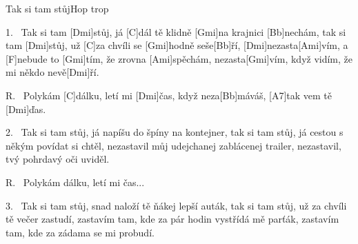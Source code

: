 \begin{song}{Tak si tam stůj}{Hop trop}

\begin{xverse}{1.~}
Tak si tam [Dmi]stůj, já [C]dál tě klidně [Gmi]na krajnici [Bb]nechám,
tak si tam [Dmi]stůj, už [C]za chvíli se [Gmi]hodně seše[Bb]{}ří,
[Dmi]nezasta[Ami]vím, a [F]nebude to [Gmi]tím, že zrovna [Ami]spěchám,
nezasta[Gmi]vím, když vidím, že mi někdo nevě[Dmi]{}ří.
\end{xverse}

\begin{xverse}{R.~}
Polykám [C]dálku, letí mi [Dmi]{}čas,
když neza[Bb]máváš, [A7]tak vem tě [Dmi]{}ďas.
\end{xverse}


\begin{xverse}{2.~}
Tak si tam stůj, já napíšu do špíny na kontejner,
tak si tam stůj, já cestou s někým povídat si chtěl,
nezastavil můj udejchanej zablácenej trailer,
nezastavil, tvý pohrdavý oči uviděl.
\end{xverse}


\begin{xverse}{R.~}
Polykám dálku, letí mi čas...
\end{xverse}


\begin{xverse}{3.~}
Tak si tam stůj, snad naloží tě ňákej lepší auták,
tak si tam stůj, už za chvíli tě večer zastudí,
zastavím tam, kde za pár hodin vystřídá mě parťák,
zastavím tam, kde za zádama se mi probudí.
\end{xverse}

\end{song}

